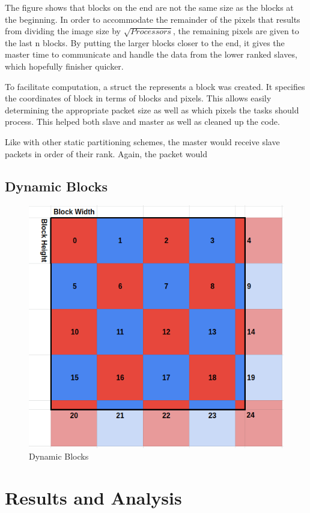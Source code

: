 \documentclass[11pt]{article}
\begin{document}
		The figure shows that blocks on the end are not the same size as the blocks at the beginning. In order to accommodate the remainder of the pixels that results from dividing the image size by $\sqrt{Processors}$, the remaining pixels are given to the last n blocks. By putting the larger blocks closer to the end, it gives the master time to communicate and handle the data from the lower ranked slaves, which hopefully finisher quicker. 
		
		To facilitate computation, a struct the represents a block was created. It specifies the coordinates of block in terms of blocks and pixels. This allows easily determining the appropriate packet size as well as which pixels the tasks should process. This helped both slave and master as well as cleaned up the code. 
		
		Like with other static partitioning schemes, the master would receive slave packets in order of their rank. Again, the packet would 
	
	\subsection{Dynamic Blocks}
	
		
		\begin{figure}[H]
			\centering
			\includegraphics[width=0.7\linewidth]{Pictures/Dynamic}
			\caption{Dynamic Blocks}
			\label{fig:dynamic}
		\end{figure}
	
\section{Results and Analysis}
\end{document}
